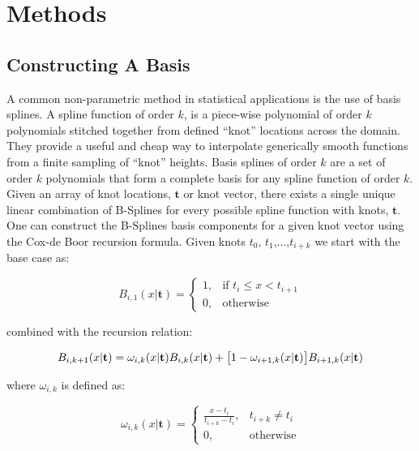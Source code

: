 \section{Methods} \label{sec:methods}

\subsection{Constructing A Basis} \label{sec:basis_splines}

A common non-parametric method in statistical applications is the use of basis splines. A spline function of order $k$, 
is a piece-wise polynomial of order $k$ polynomials stitched together from defined ``knot'' locations across the domain. 
They provide a useful and cheap way to interpolate generically smooth functions from a finite sampling of ``knot'' heights. 
Basis splines of order $k$ are a set of order $k$ polynomials that form a complete basis for any spline function of order $k$. 
Given an array of knot locations, $\mathbf{t}$ or knot vector, there exists a single unique linear combination of B-Splines for 
every possible spline function with knots, $\mathbf{t}$. One can construct the B-Splines basis components for a given knot vector 
using the Cox-de Boor recursion formula. Given knots $t_0$, $t_1$,...,$t_{i+k}$ we start with the base case as:

\begin{equation}
    B_{i,1}(x | \mathbf{t}) = 
    \begin{cases}
        1, & \text{if } t_i \leq x < t_{i+1} \\
        0, & \text{otherwise}
    \end{cases}
\end{equation}

\noindent combined with the recursion relation:

\begin{equation}
    B_{i,k+1}(x | \mathbf{t}) = \omega_{i,k}(x | \mathbf{t})B_{i,k}(x | \mathbf{t}) + \\
                                \big[1-\omega_{i+1,k}(x | \mathbf{t})\big] B_{i+1,k}(x | \mathbf{t})
\end{equation}

\noindent where $\omega_{i,k}$ is defined as:

\begin{equation}
\omega_{i,k}(x | \mathbf{t}) =
\begin{cases}
    \frac{x-t_i}{t_{i+k}-t_i}, & t_{i+k} \neq t_i \\
    0, & \text{otherwise}
\end{cases}
\end{equation}

